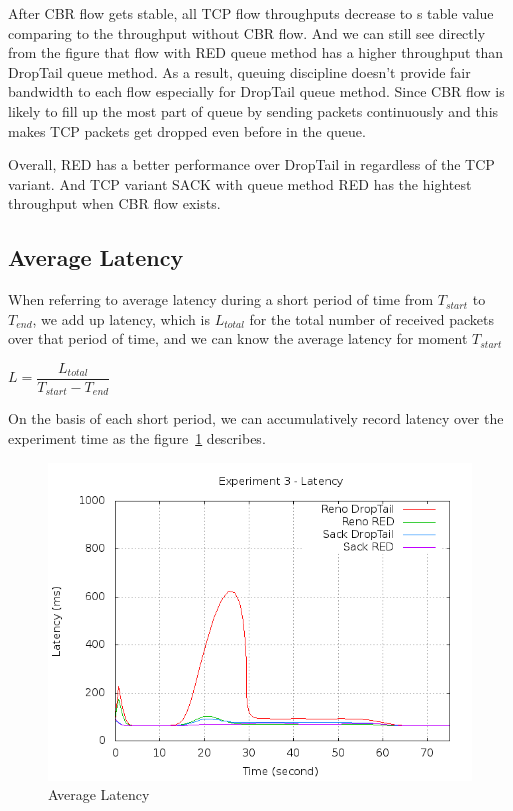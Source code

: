 \documentclass[10pt, conference]{lib/IEEEtran}
\begin{document}
After CBR flow gets stable, all TCP flow throughputs decrease to s table value comparing to the throughput without CBR flow. And we can still see directly from the figure that flow with RED queue method has a higher throughput than DropTail queue method. As a result, queuing discipline doesn’t provide fair bandwidth to each flow especially for DropTail queue method. Since CBR flow is likely to fill up the most part of queue by sending packets continuously and this makes TCP packets get dropped even before in the queue.

Overall, RED has a better performance over DropTail in regardless of the TCP variant. And TCP variant SACK with queue method RED has the hightest throughput when CBR flow exists.\\

\subsection{Average Latency}
When referring to average latency during a short period of time from $T_{start}$ to $T_{end}$, we add up latency, which is $L_{total}$ for the total number of received packets over that period of time, and we can know the average latency for moment $T_{start}$
\begin{center}
    $L = \dfrac{L_{total}}{T_{start} - T_{end}}$
\end{center}

On the basis of each short period, we can accumulatively record latency over the experiment time as the figure~\ref{fig:exp3-lt} describes.\\
\begin{figure}[!htb]
    \centering
    \includegraphics[width=0.9\linewidth]{plot/exp3-lt.png}
    \caption{Average Latency}
    \label{fig:exp3-lt}
\end{figure}
\end{document}
